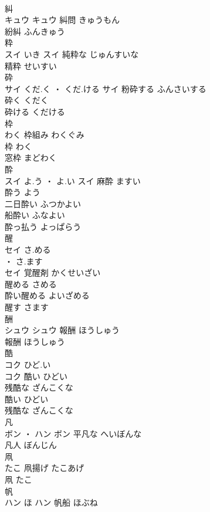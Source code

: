 \documentclass[8pt]{extreport}
\begin{document}
\begin{CJK}{UTF8}{min}
\\	糾	
\\	キュウ		キュウ	糾問	きゅうもん	
\\	紛糾	ふんきゅう	
\\	粋	
\\	スイ	いき	スイ	純粋な	じゅんすいな	
\\	精粋	せいすい	
\\	砕	
\\	サイ	くだ.く ・ くだ.ける	サイ	粉砕する	ふんさいする	
\\	砕く	くだく	
\\	砕ける	くだける	
\\	枠	
\\	わく		枠組み	わくぐみ	
\\	枠	わく	
\\	窓枠	まどわく	
\\	酔	
\\	スイ	よ.う ・ よ.い	スイ	麻酔	ますい	
\\	酔う	よう	
\\	二日酔い	ふつかよい	
\\	船酔い	ふなよい	
\\	酔っ払う	よっぱらう	
\\	醒	
\\	セイ	さ.める
\\	・ さ.ます
\\	セイ	覚醒剤	かくせいざい	
\\	醒める	さめる	
\\	酔い醒める	よいざめる	
\\	醒す	さます	
\\	酬	
\\	シュウ		シュウ	報酬	ほうしゅう	
\\	報酬	ほうしゅう	
\\	酷	
\\	コク	ひど.い
\\	コク	酷い	ひどい	
\\	残酷な	ざんこくな	
\\	酷い	ひどい	
\\	残酷な	ざんこくな	
\\	凡	
\\	ボン ・ ハン		ボン	平凡な	へいぼんな	
\\	凡人	ぼんじん	
\\	凧	
\\	たこ														凧揚げ	たこあげ	
\\	凧	たこ	
\\	帆	
\\	ハン	ほ	ハン	帆船	ほぶね	

\end{CJK}
\end{document}
